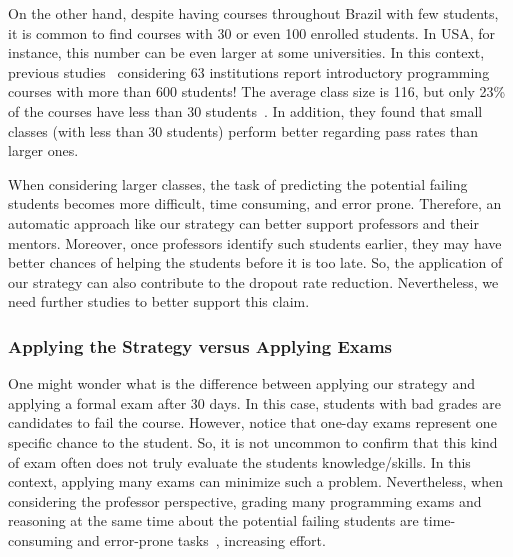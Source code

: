 On the other hand, despite having courses throughout Brazil with few students, it is common to find courses with 30 or even 100 enrolled students. In USA, for instance, this number can be even larger at some universities. In this context, previous studies~\cite{bennedsen-sigcse-failure-rates-2007} considering 63 institutions report introductory programming courses with more than 600 students! The average class size is 116, but only 23\% of the courses have less than 30 students~\cite{bennedsen-sigcse-failure-rates-2007}. In addition, they found that small classes (with less than 30 students) perform better regarding pass rates than larger ones.

When considering larger classes, the task of predicting the potential failing students becomes more difficult, time consuming, and error prone. Therefore, an automatic approach like our strategy can better support professors and their mentors. Moreover, once professors identify such students earlier, they may have better chances of helping the students before it is too late. So, the application of our strategy can also contribute to the dropout rate reduction. Nevertheless, we need further studies to better support this claim.



\subsubsection{Applying the Strategy versus Applying Exams}

One might wonder what is the difference between applying our strategy and applying a formal exam after 30 days. In this case, students with bad grades are candidates to fail the course. However, notice that one-day exams represent one specific chance to the student. So, it is not uncommon to confirm that this kind of exam often does not truly evaluate the students knowledge/skills. In this context, applying many exams can minimize such a problem. Nevertheless, when considering the professor perspective, grading many programming exams and reasoning at the same time about the potential failing students are time-consuming and error-prone tasks~\cite{cheang-online-judge-2003}, increasing effort.

